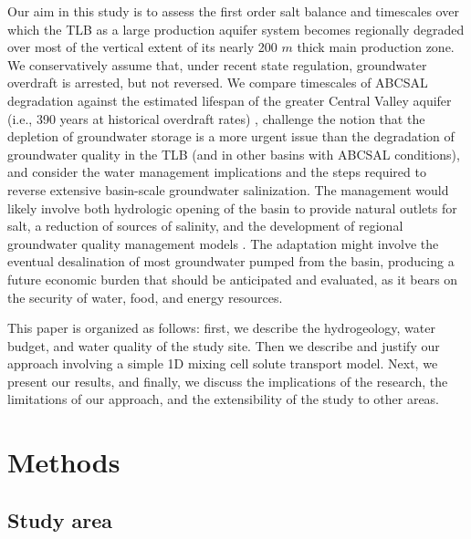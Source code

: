 Our aim in this study is to assess the first order salt balance and timescales over which the TLB as a large production aquifer system becomes regionally degraded over most of the vertical extent of its nearly 200 $m$ thick main production zone. We conservatively assume that, under recent state regulation, groundwater overdraft is arrested, but not reversed. We compare timescales of ABCSAL degradation against the estimated lifespan of the greater Central Valley aquifer (i.e., 390 years at historical overdraft rates) \citep{Faunted.2009}, challenge the notion that the depletion of groundwater storage is a more urgent issue than the degradation of groundwater quality in the TLB (and in other basins with ABCSAL conditions), and consider the water management implications and the steps required to reverse extensive basin-scale groundwater salinization. The management would likely involve both hydrologic opening of the basin to provide natural outlets for salt, a reduction of sources of salinity, and the development of regional groundwater quality management models \citep{Fogg2006, CRWQCB2018}. The adaptation might involve the eventual desalination of most groundwater pumped from the basin, producing a future economic burden that should be anticipated and evaluated, as it bears on the security of water, food, and energy resources. 

This paper is organized as follows: first, we describe the hydrogeology, water budget, and water quality of the study site. Then we describe and justify our approach involving a simple 1D mixing cell solute transport model. Next, we present our results, and finally, we discuss the implications of the research, the limitations of our approach, and the extensibility of the study to other areas.  


\section{Methods}

\subsection{Study area}
\label{ss_2_1}

